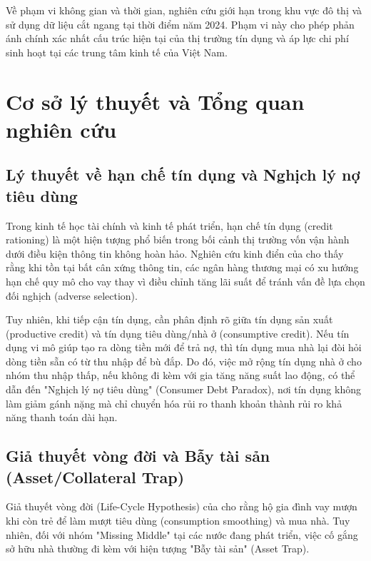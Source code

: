 \documentclass[12pt,a4paper]{report}
\begin{document}
	Về phạm vi không gian và thời gian, nghiên cứu giới hạn trong khu vực đô thị và sử dụng dữ liệu cắt ngang tại thời điểm năm 2024. Phạm vi này cho phép phản ánh chính xác nhất cấu trúc hiện tại của thị trường tín dụng và áp lực chi phí sinh hoạt tại các trung tâm kinh tế của Việt Nam.
		
\chapter{Cơ sở lý thuyết và Tổng quan nghiên cứu}

\section{Lý thuyết về hạn chế tín dụng và Nghịch lý nợ tiêu dùng}

Trong kinh tế học tài chính và kinh tế phát triển, hạn chế tín dụng (credit rationing) là một hiện tượng phổ biến trong bối cảnh thị trường vốn vận hành dưới điều kiện thông tin không hoàn hảo. Nghiên cứu kinh điển của \textcite{Stiglitz1981} cho thấy rằng khi tồn tại bất cân xứng thông tin, các ngân hàng thương mại có xu hướng hạn chế quy mô cho vay thay vì điều chỉnh tăng lãi suất để tránh vấn đề lựa chọn đối nghịch (adverse selection). 

Tuy nhiên, khi tiếp cận tín dụng, cần phân định rõ giữa tín dụng sản xuất (productive credit) và tín dụng tiêu dùng/nhà ở (consumptive credit). Nếu tín dụng vi mô giúp tạo ra dòng tiền mới để trả nợ, thì tín dụng mua nhà lại đòi hỏi dòng tiền sẵn có từ thu nhập để bù đắp. Do đó, việc mở rộng tín dụng nhà ở cho nhóm thu nhập thấp, nếu không đi kèm với gia tăng năng suất lao động, có thể dẫn đến "Nghịch lý nợ tiêu dùng" (Consumer Debt Paradox), nơi tín dụng không làm giảm gánh nặng mà chỉ chuyển hóa rủi ro thanh khoản thành rủi ro khả năng thanh toán dài hạn.



\section{Giả thuyết vòng đời và Bẫy tài sản (Asset/Collateral Trap)}

Giả thuyết vòng đời (Life-Cycle Hypothesis) của \textcite{Modigliani1963} cho rằng hộ gia đình vay mượn khi còn trẻ để làm mượt tiêu dùng (consumption smoothing) và mua nhà. Tuy nhiên, đối với nhóm "Missing Middle" tại các nước đang phát triển, việc cố gắng sở hữu nhà thường đi kèm với hiện tượng "Bẫy tài sản" (Asset Trap).
\end{document}
